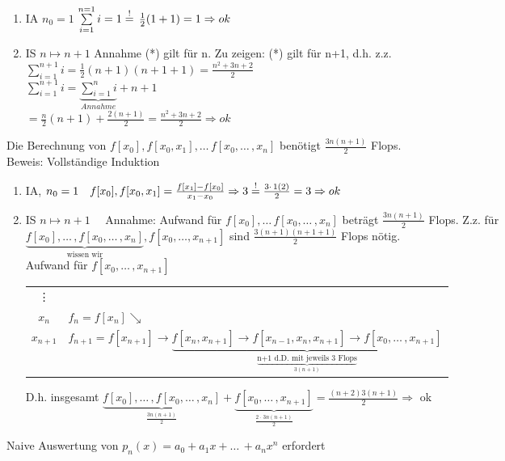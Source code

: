 \begin{enumerate}
	\item IA $n_0=1$ $\sum\limits_{i=1}^{n=1}{i}=1\overset{!}{=}\,\frac{1}{2}(1+1)=1 \Rightarrow ok$
	\item IS $n \mapsto n+1$ Annahme (*) gilt für n. Zu zeigen: (*) gilt für n+1, d.h. z.z.\\
	$\sum\limits_{i=1}^{n+1}{i}=\frac{1}{2}(n+1)(n+1+1)=\frac{n^2+3n+2}{2}$\\
	$\sum\limits_{i=1}^{n+1}{i}=\underbrace{\sum\limits_{i=1}^{n}{i}}_{Annahme} + n+1$ \\
	$=\frac{n}{2}(n+1) + \frac{2(n+1)}{2}= \frac{n^2+3n+2}{2} \Rightarrow ok$
\end{enumerate}

Die Berechnung von $f[x_0], f[x_0,x_1],\ldots\,f[x_0,\ldots\,,x_n]$ benötigt $\frac{3n(n+1)}{2}$ Flops. \\
Beweis: Vollständige Induktion\\

\begin{enumerate}
	\item IA, $n_0=1 \quad f[x_0],f[x_0,x_1]=\frac{f[x_1]-f[x_0]}{x_1-x_0} \Rightarrow 3 \overset{!}{=} \frac{3\cdot\,1(2)}{2}=3 \Rightarrow ok$
	\item IS $n \mapsto n+1 \quad$ Annahme: Aufwand für $f[x_0], \ldots\,f[x_0,\ldots\,,x_n]$ beträgt $\frac{3n(n+1)}{2}$ Flops. Z.z. für $\underbrace{f[x_0], \ldots\,,f[x_0,\ldots\,,x_n]}_{\text{wissen wir}},f[x_0,\ldots,x_{n+1}]$ sind $\frac{3(n+1)(n+1+1)}{2}$ Flops nötig. \\
Aufwand für $f[x_0,\ldots\,,x_{n+1}]$\\
\begin{tabular}{c|l}
\vdots \\
$x_{n}$ & $f_{n} = f[x_{n}] \searrow$\\
$x_{n+1}$ & $f_{n+1} = f[x_{n+1}] \rightarrow \underbrace{f[x_n,x_{n+1}] \rightarrow f[x_{n-1},x_n,x_{n+1}] \rightarrow f[x_0,\ldots\,,x_{n+1}]}_{\underbrace{\text{n+1 d.D. mit jeweils 3 Flops}}_{3(n+1)}}$ 
\end{tabular}

D.h. insgesamt $\underbrace{f[x_0],\ldots\,,f[x_0,\ldots\,,x_n]}_{\frac{3n(n+1)}{2}} + \underbrace{f[x_0,\ldots\,,x_{n+1}]}_{\frac{2\cdot\,3n(n+1)}{2}} = \frac{(n+2)3(n+1)}{2} \Rightarrow $ ok
\end{enumerate}

Naive Auswertung von $p_n(x) = a_0+a_1x+\ldots\,+a_nx^n$ erfordert 

